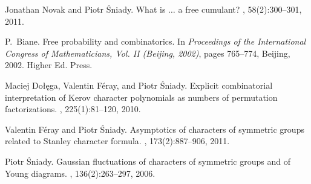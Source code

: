 \documentclass{emsprocart}
\theoremstyle{definition}
\begin{document}
\begin{thebibliography}{1}

Jonathan Novak and Piotr {\'S}niady.
\newblock What is {$\dots$} a free cumulant?
, 58(2):300--301, 2011.

P.~Biane.
\newblock Free probability and combinatorics.
\newblock In {\em Proceedings of the {I}nternational {C}ongress of
  {M}athematicians, {V}ol. {II} ({B}eijing, 2002)}, pages 765--774, Beijing,
  2002. Higher Ed. Press.

Maciej Do{\l}\k{e}ga, Valentin F{\'e}ray, and Piotr {\'S}niady.
\newblock Explicit combinatorial interpretation of {K}erov character
  polynomials as numbers of permutation factorizations.
, 225(1):81--120, 2010.

Valentin F{\'e}ray and Piotr {\'S}niady.
\newblock Asymptotics of characters of symmetric groups related to {S}tanley
  character formula.
, 173(2):887--906, 2011.

Piotr {\'S}niady.
\newblock Gaussian fluctuations of characters of symmetric groups and of
  {Y}oung diagrams.
, 136(2):263--297, 2006.

\end{thebibliography}
\end{document}

